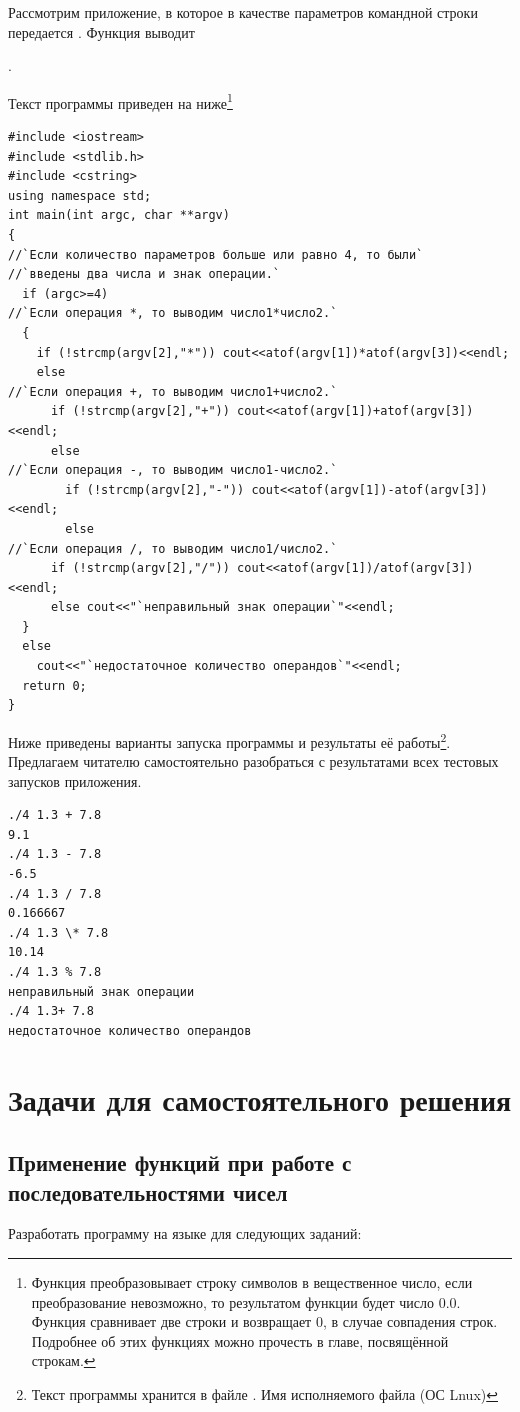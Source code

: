 Рассмотрим приложение, в которое в качестве параметров командной строки 
передается . Функция выводит

.

Текст программы приведен на ниже\footnote{Функция  преобразовывает строку символов в вещественное число, если
преобразование невозможно, то результатом функции  будет число 0.0. Функция  сравнивает две строки и
возвращает 0, в случае совпадения строк. Подробнее об этих функциях можно прочесть в главе, посвящённой строкам.}
\begin{lstlisting}
#include <iostream>
#include <stdlib.h>
#include <cstring>
using namespace std;
int main(int argc, char **argv)
{
//`Если количество параметров больше или равно 4, то были`
//`введены два числа и знак операции.`
  if (argc>=4)
//`Если операция *, то выводим число1*число2.`
  {
    if (!strcmp(argv[2],"*")) cout<<atof(argv[1])*atof(argv[3])<<endl;
    else
//`Если операция +, то выводим число1+число2.`
      if (!strcmp(argv[2],"+")) cout<<atof(argv[1])+atof(argv[3])<<endl;
      else 
//`Если операция -, то выводим число1-число2.`
        if (!strcmp(argv[2],"-")) cout<<atof(argv[1])-atof(argv[3])<<endl;
        else 
//`Если операция /, то выводим число1/число2.`
	  if (!strcmp(argv[2],"/")) cout<<atof(argv[1])/atof(argv[3])<<endl;
	  else cout<<"`неправильный знак операции`"<<endl;	
  }
  else
    cout<<"`недостаточное количество операндов`"<<endl;
  return 0;
}
\end{lstlisting}

Ниже приведены варианты запуска программы и результаты её работы\footnote{Текст программы хранится в файле
. Имя исполняемого файла  (ОС Lnux)}. Предлагаем читателю самостоятельно разобраться с
результатами всех тестовых запусков приложения.
\begin{verbatim}
./4 1.3 + 7.8 
9.1 
./4 1.3 - 7.8 
-6.5 
./4 1.3 / 7.8 
0.166667 
./4 1.3 \* 7.8 
10.14 
./4 1.3 % 7.8 
неправильный знак операции 
./4 1.3+ 7.8 
недостаточное количество операндов 
\end{verbatim}

\section[Задачи для самостоятельного решения]{Задачи для самостоятельного решения}
\subsection[Применение функций при работе с последовательностями чисел]{Применение функций при работе с
последовательностями чисел}
Разработать программу на языке  для следующих заданий:


